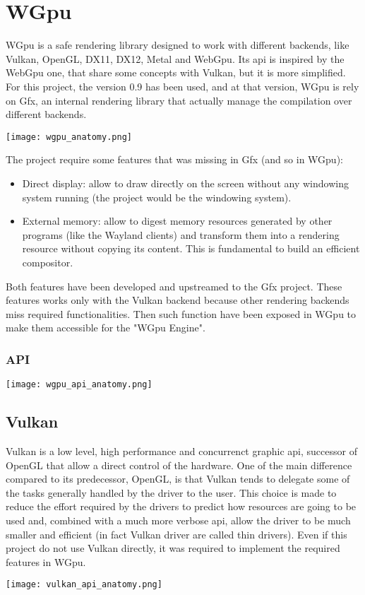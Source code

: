 \chapter{WGpu}
WGpu is a safe rendering library designed to work with different backends, like Vulkan, OpenGL, DX11, DX12, Metal and WebGpu. Its api is inspired by the WebGpu one, that share some concepts with Vulkan, but it is more simplified. For this project, the version 0.9 has been used, and at that version, WGpu is rely on Gfx, an internal rendering library that actually manage the compilation over different backends.
\begin{center}
	\texttt{[image: wgpu\_anatomy.png]}
\end{center}

The project require some features that was missing in Gfx (and so in WGpu):
\begin{itemize}
	\item Direct display: allow to draw directly on the screen without any windowing system running (the project would be the windowing system).
	\item External memory: allow to digest memory resources generated by other programs (like the Wayland clients) and transform them into a rendering resource without copying its content. This is fundamental to build an efficient compositor.
\end{itemize}
Both features have been developed and upstreamed to the Gfx project. These features works only with the Vulkan backend because other rendering backends miss required functionalities. Then such function have been exposed in WGpu to make them accessible for the "WGpu Engine".

\subsection{API}
\begin{center}
	\texttt{[image: wgpu\_api\_anatomy.png]}
\end{center}

\section{Vulkan}
Vulkan is a low level, high performance and concurrenct graphic api, successor of OpenGL that allow a direct control of the hardware.
One of the main difference compared to its predecessor, OpenGL, is that Vulkan tends to delegate some of the tasks generally handled by the driver to the user. This choice is made to reduce the effort required by the drivers to predict how resources are going to be used and, combined with a much more verbose api, allow the driver to be much smaller and efficient (in fact Vulkan driver are called thin drivers). Even if this project do not use Vulkan directly, it was required to implement the required features in WGpu.
\begin{center}
	\texttt{[image: vulkan\_api\_anatomy.png]}
\end{center}


